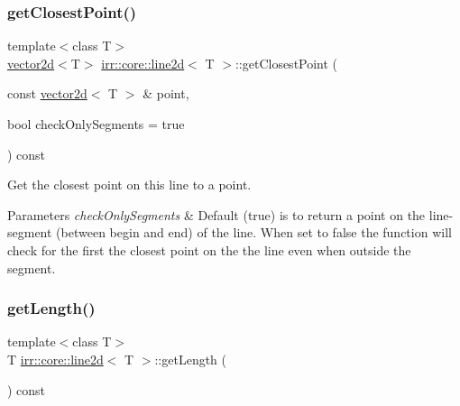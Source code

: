 \subsubsection{\texorpdfstring{get\+Closest\+Point()}{getClosestPoint()}\hspace{0.1cm}{\footnotesize\ttfamily [2/2]}}
{\footnotesize\ttfamily template$<$class T$>$ \\
\hyperlink{classirr_1_1core_1_1vector2d}{vector2d}$<$T$>$ \hyperlink{classirr_1_1core_1_1line2d}{irr\+::core\+::line2d}$<$ T $>$\+::get\+Closest\+Point (\begin{DoxyParamCaption}\item[{const \hyperlink{classirr_1_1core_1_1vector2d}{vector2d}$<$ T $>$ \&}]{point,  }\item[{bool}]{check\+Only\+Segments = {\ttfamily true} }\end{DoxyParamCaption}) const\hspace{0.3cm}{\ttfamily [inline]}}



Get the closest point on this line to a point. 


\begin{DoxyParams}{Parameters}
{\em check\+Only\+Segments} & Default (true) is to return a point on the line-\/segment (between begin and end) of the line. When set to false the function will check for the first the closest point on the the line even when outside the segment. \\
\hline
\end{DoxyParams}
\mbox{\label{classirr_1_1core_1_1line2d_a7322cb613e5e076ce6ff258e0f67dc0a}} 
\subsubsection{\texorpdfstring{get\+Length()}{getLength()}\hspace{0.1cm}{\footnotesize\ttfamily [1/2]}}
{\footnotesize\ttfamily template$<$class T$>$ \\
T \hyperlink{classirr_1_1core_1_1line2d}{irr\+::core\+::line2d}$<$ T $>$\+::get\+Length (\begin{DoxyParamCaption}{ }\end{DoxyParamCaption}) const\hspace{0.3cm}{\ttfamily [inline]}}



